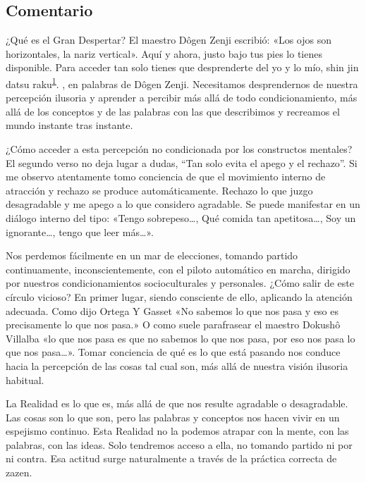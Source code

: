 \documentclass[
  a5paperpaper,
]{article}
\begin{document}
\hypertarget{comentario}{%
\subsection{Comentario}\label{comentario}}

¿Qué es el Gran Despertar? El maestro Dôgen Zenji escribió: «Los ojos
son horizontales, la nariz vertical». Aquí y ahora, justo bajo tus pies
lo tienes disponible. Para acceder tan solo tienes que desprenderte del
yo y lo mío, shin jin datsu
raku\textsuperscript{\protect\hypertarget{ref1}{\protect\hyperlink{nota1}{1}}}.
, en palabras de Dôgen Zenji. Necesitamos desprendernos de nuestra
percepción ilusoria y aprender a percibir más allá de todo
condicionamiento, más allá de los conceptos y de las palabras con las
que describimos y recreamos el mundo instante tras instante.

¿Cómo acceder a esta percepción no condicionada por los constructos
mentales? El segundo verso no deja lugar a dudas, ``Tan solo evita el
apego y el rechazo''. Si me observo atentamente tomo conciencia de que
el movimiento interno de atracción y rechazo se produce automáticamente.
Rechazo lo que juzgo desagradable y me apego a lo que considero
agradable. Se puede manifestar en un diálogo interno del tipo: «Tengo
sobrepeso\ldots, Qué comida tan apetitosa\ldots, Soy un ignorante\ldots,
tengo que leer más\ldots».

Nos perdemos fácilmente en un mar de elecciones, tomando partido
continuamente, inconscientemente, con el piloto automático en marcha,
dirigido por nuestros condicionamientos socioculturales y personales.
¿Cómo salir de este círculo vicioso? En primer lugar, siendo consciente
de ello, aplicando la atención adecuada. Como dijo Ortega Y Gasset «No
sabemos lo que nos pasa y eso es precisamente lo que nos pasa.» O como
suele parafrasear el maestro Dokushô Villalba «lo que nos pasa es que no
sabemos lo que nos pasa, por eso nos pasa lo que nos pasa\ldots». Tomar
conciencia de qué es lo que está pasando nos conduce hacia la percepción
de las cosas tal cual son, más allá de nuestra visión ilusoria habitual.

La Realidad es lo que es, más allá de que nos resulte agradable o
desagradable. Las cosas son lo que son, pero las palabras y conceptos
nos hacen vivir en un espejismo continuo. Esta Realidad no la podemos
atrapar con la mente, con las palabras, con las ideas. Solo tendremos
acceso a ella, no tomando partido ni por ni contra. Esa actitud surge
naturalmente a través de la práctica correcta de zazen.
\end{document}
